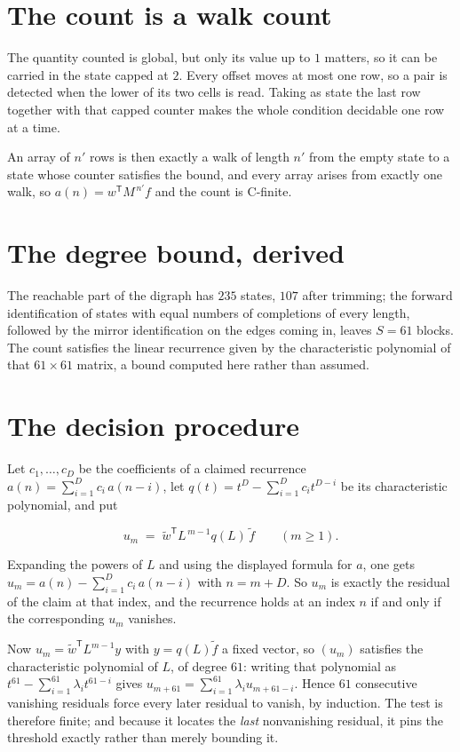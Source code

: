 \documentclass[11pt]{article}
\theoremstyle{definition}
\begin{document}
\section{The count is a walk count}

The quantity counted is global, but only its value up to $1$ matters, so it can be carried in the state capped at $2$. Every offset moves at most one row, so a pair is detected when the lower of its two cells is read. Taking as state the last row together with that capped counter makes the whole condition decidable one row at a time.

An array of $n'$ rows is then exactly a walk of length $n'$ from the empty state to a state whose counter satisfies the bound, and every array arises from exactly one walk, so $a(n) = w^{\mathsf T}M^{\,n'}f$ and the count is C-finite.

\section{The degree bound, derived}

The reachable part of the digraph has $235$ states, $107$ after trimming; the forward identification of states with equal numbers of completions of every length, followed by the mirror identification on the edges coming in, leaves $S = 61$ blocks. The count satisfies the linear recurrence given by the characteristic polynomial of that $61\times61$ matrix, a bound computed here rather than assumed.

\section{The decision procedure}

Let $c_1,\dots,c_D$ be the coefficients of a claimed recurrence $a(n) = \sum_{i=1}^{D} c_i\,a(n-i)$, let $q(t) = t^{D} - \sum_{i=1}^{D} c_i t^{D-i}$ be its characteristic polynomial, and put

\[u_m \;=\; \tilde w^{\mathsf T} L^{\,m-1} q(L)\,\tilde f \qquad (m \ge 1).\]

Expanding the powers of $L$ and using the displayed formula for $a$, one gets $u_m = a(n) - \sum_{i=1}^{D} c_i\,a(n-i)$ with $n = m + D$. So $u_m$ is exactly the residual of the claim at that index, and the recurrence holds at an index $n$ if and only if the corresponding $u_m$ vanishes.

Now $u_m = \tilde w^{\mathsf T} L^{m-1} y$ with $y = q(L)\tilde f$ a fixed vector, so $(u_m)$ satisfies the characteristic polynomial of $L$, of degree $61$: writing that polynomial as $t^{61} - \sum_{i=1}^{61} \lambda_i t^{61-i}$ gives $u_{m+61} = \sum_{i=1}^{61} \lambda_i u_{m+61-i}$. Hence $61$ consecutive vanishing residuals force every later residual to vanish, by induction. The test is therefore finite; and because it locates the {\itshape last} nonvanishing residual, it pins the threshold exactly rather than merely bounding it.
\end{document}
